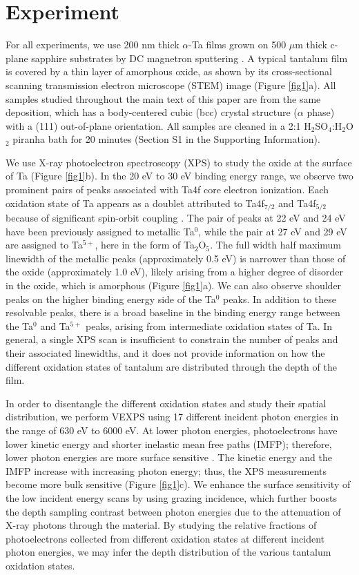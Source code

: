 \documentclass{WileyMSP-template}
\begin{document}
\section{Experiment}

For all experiments, we use 200 nm thick $\alpha$-Ta films grown on 500 $\mu$m thick c-plane sapphire substrates by DC magnetron sputtering \cite{place_new_2021, kevin_resonator}. A typical tantalum film is covered by a thin layer of amorphous oxide, as shown by its cross-sectional scanning transmission electron microscope (STEM) image (Figure \ref{fig1}a). All samples studied throughout the main text of this paper are from the same deposition, which has a body-centered cubic (bcc) crystal structure ($\alpha$ phase) with a (111) out-of-plane orientation. All samples are cleaned in a 2:1 H$_2$SO$_4$:H$_2$O$_2$ piranha bath for 20 minutes (Section S1 in the Supporting Information).

We use X-ray photoelectron spectroscopy (XPS) to study the oxide at the surface of Ta (Figure \ref{fig1}b). In the 20 eV to 30 eV binding energy range, we observe two prominent pairs of peaks associated with Ta4f core electron ionization. Each oxidation state of Ta appears as a doublet attributed to Ta4f$_{7/2}$ and Ta4f$_{5/2}$ because of significant spin-orbit coupling \cite{Moulder:1992}. The pair of peaks at 22 eV and 24 eV have been previously assigned to metallic Ta$^{0}$, while the pair at 27 eV and 29 eV are assigned to Ta$^{5+}$, here in the form of Ta$_2$O$_5$. The full width half maximum linewidth of the metallic peaks (approximately 0.5 eV) is narrower than those of the oxide (approximately 1.0 eV), likely arising from a higher degree of disorder in the oxide, which is amorphous (Figure \ref{fig1}a). We can also observe shoulder peaks on the higher binding energy side of the Ta$^{0}$ peaks. In addition to these resolvable peaks, there is a broad baseline in the binding energy range between the Ta$^{0}$ and Ta$^{5+}$ peaks, arising from intermediate oxidation states of Ta. In general, a single XPS scan is insufficient to constrain the number of peaks and their associated linewidths, and it does not provide information on how the different oxidation states of tantalum are distributed through the depth of the film.

In order to disentangle the different oxidation states and study their spatial distribution, we perform VEXPS using 17 different incident photon energies in the range of 630 eV to 6000 eV. At lower photon energies, photoelectrons have lower kinetic energy and shorter inelastic mean free paths (IMFP); therefore, lower photon energies are more surface sensitive \cite{Moulder:1992}. The kinetic energy and the IMFP increase with increasing photon energy; thus, the XPS measurements become more bulk sensitive (Figure \ref{fig1}c). We enhance the surface sensitivity of the low incident energy scans by using grazing incidence, which further boosts the depth sampling contrast between photon energies due to the attenuation of X-ray photons through the material. By studying the relative fractions of photoelectrons collected from different oxidation states at different incident photon energies, we may infer the depth distribution of the various tantalum oxidation states.
\end{document}
